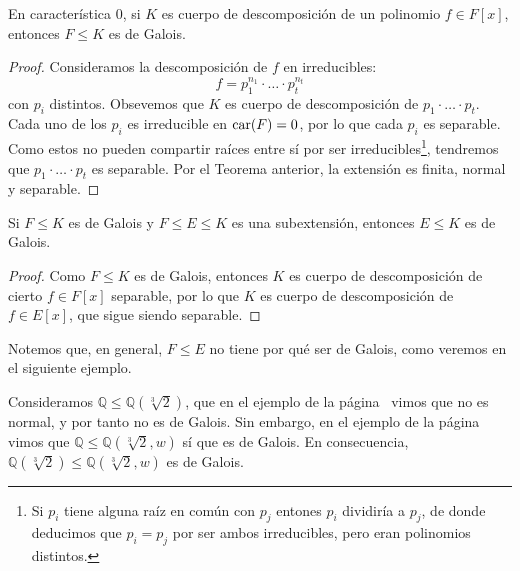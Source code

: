\begin{coro}
    En característica $0$, si $K$ es cuerpo de descomposición de un polinomio $f\in F[x]$, entonces $F\leq K$ es de Galois.
    \begin{proof}
        Consideramos la descomposición de $f$ en irreducibles:
        \begin{equation*}
            f = p_1^{n_1}\cdot \ldots \cdot p_t^{n_t}
        \end{equation*}
        con $p_i$ distintos. Obsevemos que $K$ es cuerpo de descomposición de $p_1\cdot \ldots\cdot p_t$. Cada uno de los $p_i$ es irreducible en $\operatorname{car}(F) = 0$, por lo que cada $p_i$ es separable. Como estos no pueden compartir raíces entre sí por ser irreducibles\footnote{Si $p_i$ tiene alguna raíz en común con $p_j$ entones $p_i$ dividiría a $p_j$, de donde deducimos que $p_i=p_j$ por ser ambos irreducibles, pero eran polinomios distintos.}, tendremos que $p_1\cdot \ldots\cdot p_t$ es separable. Por el Teorema anterior, la extensión es finita, normal y separable.
    \end{proof}
\end{coro}

\begin{coro}
    Si $F\leq K$ es de Galois y $F\leq E\leq K$ es una subextensión, entonces $E\leq K$ es de Galois.
    \begin{proof}
        Como $F\leq K$ es de Galois, entonces $K$ es cuerpo de descomposición de cierto $f\in F[x]$ separable, por lo que $K$ es cuerpo de descomposición de $f\in E[x]$, que sigue siendo separable.
    \end{proof}
\end{coro}

Notemos que, en general, $F\leq E$ no tiene por qué ser de Galois, como veremos en el siguiente ejemplo.

\begin{ejemplo}
    Consideramos $\mathbb{Q}\leq \mathbb{Q}\left(\sqrt[3]{2}\right)$, que en el ejemplo de la página~\pageref{ejemplo:extension_no_normal} vimos que no es normal, y por tanto no es de Galois. Sin embargo, en el ejemplo de la página~\pageref{ejemplo:extensiones_de_galois} vimos que $\mathbb{Q}\leq \mathbb{Q}\left(\sqrt[3]{2},w\right)$ sí que es de Galois. En consecuencia, $\mathbb{Q}(\sqrt[3]{2})\leq \mathbb{Q}\left(\sqrt[3]{2},w\right)$ es de Galois.
\end{ejemplo}

